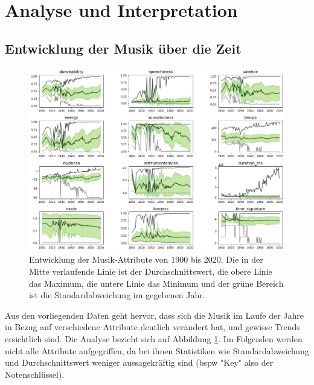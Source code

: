 \documentclass[conference]{IEEEtran}
\begin{document}
\section{Analyse und Interpretation}
\subsection{Entwicklung der Musik über die Zeit}
\begin{figure}[t]
\centering
\includegraphics[width=\textwidth]{images/over_time.png}
\caption{Entwicklung der Musik-Attribute von 1900 bis 2020. Die in der Mitte verlaufende Linie ist der Durchschnittswert, die obere Linie das Maximum, die untere Linie das Minimum und der grüne Bereich ist die Standardabweichung im gegebenen Jahr.}
\label{time}
\end{figure}
Aus den vorliegenden Daten geht hervor, dass sich die Musik im Laufe der Jahre in Bezug auf verschiedene Attribute deutlich verändert hat, und gewisse Trends ersichtlich sind. Die Analyse bezieht sich auf Abbildung \ref{time}. Im Folgenden werden nicht alle Attribute aufgegriffen, da bei ihnen Statistiken wie Standardabweichung und Durchschnittswert weniger aussagekräftig sind (bspw "Key" also der Notenschlüssel).
\end{document}
